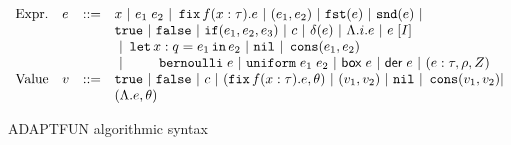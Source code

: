 \begin{figure}
    \centering
    \[\begin{array}{llll}
\mbox{Expr.} & \expr & ::= & x ~|~ \expr_1 \eapp \expr_2 ~|~ \efix f(x:\type).\expr
 ~|~ (\expr_1, \expr_2) ~|~ \eprojl(\expr) ~|~ \eprojr(\expr) ~| \\
%
& & & \etrue ~|~ \efalse ~|~ \eif(\expr_1, \expr_2, \expr_3) ~|~
\econst ~|~ \eop(\expr)  ~|~  \eilam i. \expr ~|~ \expr \eapp [I]  \\
& & & ~|~  \elet  x:q = \expr_1 \ein \expr_2  ~|~ \enil ~|~  \econs (
      \expr_1, \expr_2) \\
& & & ~|~  ~~~~~~~
 \bernoulli \eapp \expr ~|~ \uniform \eapp \expr_1 \eapp
      \expr_2 ~|~ \cbox \eapp \expr ~|~ \cder \eapp \expr ~|~ (\expr: \type, \dmap, \nnatA) \\
%
\mbox{Value} & \valr & ::= & \etrue ~|~ \efalse ~|~ \econst ~|~
(\efix f(x:\type).\expr, \env) ~|~ (\valr_1, \valr_2) 
    ~|~ \enil ~|~ \econs (\valr_1, \valr_2) | \\
& & & (\eilam \expr , \env)  
\end{array}\]
    \caption{ADAPTFUN algorithmic syntax}
    \label{fig:core-syntax}
\end{figure}


